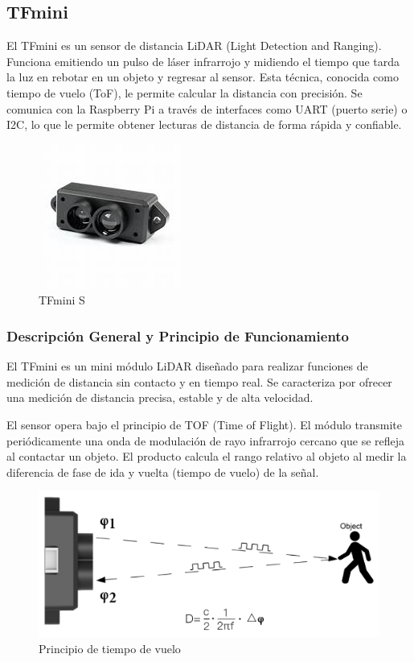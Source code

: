 \documentclass[12pt,a4paper]{article}
\begin{document}
\subsection{TFmini}
El TFmini es un sensor de distancia LiDAR (Light Detection and Ranging). Funciona emitiendo un pulso de láser infrarrojo y midiendo el tiempo que tarda la luz en rebotar en un objeto y regresar al sensor. Esta técnica, conocida como tiempo de vuelo (ToF), le permite calcular la distancia con precisión. Se comunica con la Raspberry Pi a través de interfaces como UART (puerto serie) o I2C, lo que le permite obtener lecturas de distancia de forma rápida y confiable.

\begin{figure}[H]
    \centering
    \includegraphics[width=0.5\linewidth]{Carpeta tecnica/TFmini.png}
    \caption{TFmini S}
\end{figure}

\subsubsection{Descripción General y Principio de Funcionamiento}

El TFmini es un mini módulo LiDAR diseñado para realizar funciones de medición de distancia sin contacto y en tiempo real. Se caracteriza por ofrecer una medición de distancia precisa, estable y de alta velocidad.

El sensor opera bajo el principio de TOF (Time of Flight). El módulo transmite periódicamente una onda de modulación de rayo infrarrojo cercano que se refleja al contactar un objeto. El producto calcula el rango relativo al objeto al medir la diferencia de fase de ida y vuelta (tiempo de vuelo) de la señal.

\begin{figure}[H]
    \centering
    \includegraphics[width=0.8\linewidth]{Carpeta tecnica/principvuelo.png}
    \caption{Principio de tiempo de vuelo}
    \label{fig:placeholder}
\end{figure}
\end{document}
